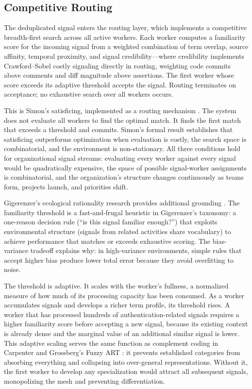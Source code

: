 \documentclass[11pt,a4paper]{article}
\begin{document}
\subsection{Competitive Routing}
\label{sec:routing}

The deduplicated signal enters the routing layer, which implements a competitive breadth-first search across all active workers. Each worker computes a familiarity score for the incoming signal from a weighted combination of term overlap, source affinity, temporal proximity, and signal credibility---where credibility implements Crawford--Sobel costly signaling directly in routing, weighting code commits above comments and diff magnitude above assertions. The first worker whose score exceeds its adaptive threshold accepts the signal. Routing terminates on acceptance; no exhaustive search over all workers occurs.

This is Simon's satisficing, implemented as a routing mechanism \citep{simon1956}. The system does not evaluate all workers to find the optimal match. It finds the first match that exceeds a threshold and commits. Simon's formal result establishes that satisficing outperforms optimization when evaluation is costly, the search space is combinatorial, and the environment is non-stationary. All three conditions hold for organizational signal streams: evaluating every worker against every signal would be quadratically expensive, the space of possible signal-worker assignments is combinatorial, and the organization's structure changes continuously as teams form, projects launch, and priorities shift.

Gigerenzer's ecological rationality research provides additional grounding \citep{gigerenzer2008}. The familiarity threshold is a fast-and-frugal heuristic in Gigerenzer's taxonomy: a one-reason decision rule (``is this signal familiar enough?'') that exploits environmental structure (signals from related activities share vocabulary) to achieve performance that matches or exceeds exhaustive scoring. The bias-variance tradeoff explains why: in high-variance environments, simple rules that accept higher bias produce lower total error because they avoid overfitting to noise.

The threshold is adaptive. It scales with the worker's fullness, a normalized measure of how much of its processing capacity has been consumed. As a worker accumulates signals and develops a richer term profile, its threshold rises. A worker that has processed hundreds of authentication-related signals requires a higher familiarity score before accepting a new signal, because its existing context is already dense and the marginal value of an additional similar signal is lower. This adaptive scaling serves the same function as complement coding in Carpenter and Grossberg's Fuzzy ART \citep{carpenter1991}: it prevents established categories from absorbing everything and collapsing into over-general representations. Without it, the first worker to develop any specialization would attract all subsequent signals, monopolizing the mesh and preventing differentiation.
\end{document}
